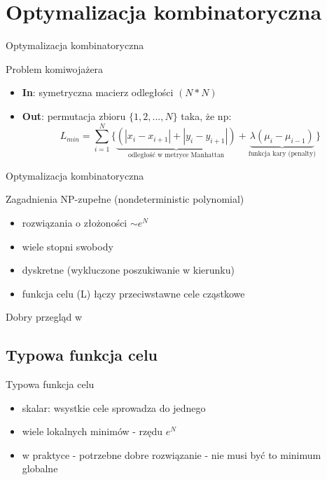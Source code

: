 \section{Optymalizacja kombinatoryczna}

	\begin{frame}{Optymalizacja kombinatoryczna }
		\begin{exampleblock}{Problem komiwojażera}
			\begin{itemize}
				\item \textbf{In}: symetryczna macierz odległości $(N*N)$
						
				\item \textbf{Out}: permutacja zbioru $\{1,2,...,N\}$ taka, że np:
					$$
						L_{min} = \sum_{i=1}^N \{ \underbrace{(|x_i - x_{i+1}| + |y_i - y_{i+1}|)}_\text{odległość w metryce Manhattan} + \underbrace{\lambda(\mu_i - \mu_{i-1})}_\text{funkcja kary (penalty)}\}
					$$
			\end{itemize}		
		\end{exampleblock}
		
	\end{frame}

	\begin{frame}{Optymalizacja kombinatoryczna}
		\begin{exampleblock}{Zagadnienia NP-zupełne (nondeterministic polynomial)}
			\begin{itemize}
				\item rozwiązania o złożoności $\sim e^N$
				\item wiele stopni swobody
				\item dyskretne (wykluczone poszukiwanie w kierunku)
				\item funkcja celu (L) łączy przeciwstawne cele cząstkowe			
			\end{itemize}
		\end{exampleblock}
		Dobry przegląd w \cite{garey}
	\end{frame}
	
\subsection{Typowa funkcja celu}
	\begin{frame}{Typowa funkcja celu}
		\begin{itemize}
			\item skalar: wsystkie cele sprowadza do jednego
			\item wiele lokalnych minimów - rzędu $e^N$
			\item w praktyce - potrzebne dobre rozwiązanie - nie musi być to minimum globalne	
		\end{itemize}

	\end{frame}

